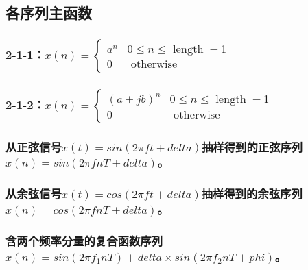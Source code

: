 \documentclass{../source/Experiment}
\begin{document}
\subsection{各序列主函数}
\subsubsection{2-1-1：$x(n)= \begin{cases}a^{n} & 0 \leq n \leq \text { length }-1 \\ 0 & \text { otherwise }\end{cases}$}



\subsubsection{2-1-2：$x(n)=\left\{\begin{array}{cl}(a+j b)^{n} & 0 \leq n \leq \text { length }-1 \\ 0 & \text { otherwise }\end{array}\right.$}


\subsubsection{从正弦信号$x(t)=sin(2\pi ft+delta)$抽样得到的正弦序列$x(n)=sin(2\pi fnT+delta)$。}


\subsubsection{从余弦信号$x(t)=cos(2\pi ft+delta)$抽样得到的余弦序列$x(n)=cos(2\pi fnT+delta)$。}


\subsubsection{含两个频率分量的复合函数序列$x(n)=sin(2\pi f_1 n T)+delta \times sin(2\pi f_2 nT+phi)$。}
\end{document}
